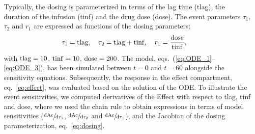 \documentclass[journal, a4paper]{IEEEtran}
\begin{document}
Typically, the dosing is parameterized in terms of the lag time (tlag), the duration of the infusion (tinf) and the drug dose (dose). The event parameters $\tau_1$, $\tau_2$ and $r_1$ are expressed as functions of the dosing parameters:
\begin{align}
    \tau_1 = {\rm tlag},\quad \tau_2 = {\rm tlag} + {\rm tinf},\quad r_1 &= \frac{\rm dose}{\rm tinf},\label{eq:dosing}
\end{align}
with ${\rm tlag} = 10$, ${\rm tinf} = 10$, ${\rm dose} = 200$. The model, eqs.~(\ref{eq:ODE_1}--\ref{eq:ODE_3}), has been simulated between $t = 0$ and $t = 60$ alongside the sensitivity equations. Subsequently, the response in the effect compartment, eq.~\eqref{eq:effect}, was evaluated based on the solution of the ODE. To illustrate the event sensitivities, we computed derivatives of the Effect with respect to tlag, tinf and dose, where we used the chain rule to obtain expressions in terms of model sensitivities ($\sfrac{\rm dAc}{\rm d \tau_1}$, $\sfrac{\rm dAc}{\rm d \tau_2}$ and $\sfrac{\rm dAc}{{\rm d} r_1}$), and the Jacobian of the dosing parameterization, eq.~\eqref{eq:dosing}.
\end{document}
